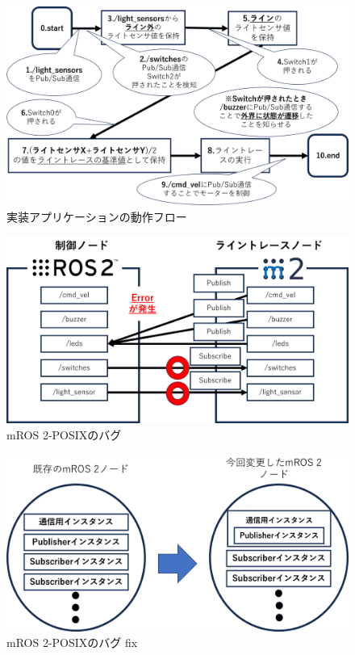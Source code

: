 \begin{figure}[h]
    \centering
    \includegraphics[width=15cm]{images/fig5_moveflow.png}
    \caption{実装アプリケーションの動作フロー}
    \label{fig:moveflow}
\end{figure}

\begin{figure}[h]
    \centering
    \includegraphics[width=15cm]{images/fig4_mros2bug.png}
    \caption{mROS 2-POSIXのバグ}
    \label{fig:mros2bug}
\end{figure}

\begin{figure}[h]
    \centering
    \includegraphics[width=15cm]{images/fig4_mros2bug_fix.png}
    \caption{mROS 2-POSIXのバグ fix}
    \label{fig:mros2bug-fix}
\end{figure}
\label{chap:implementation}

